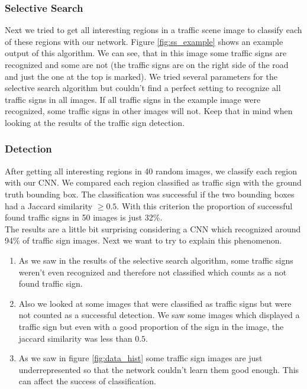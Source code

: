 \documentclass[12pt,a4paper,bibliography=totocnumbered,listof=totocnumbered]{scrartcl}
\begin{document}
\subsubsection{Selective Search}

Next we tried to get all interesting regions in a traffic scene image to classify each of these regions with our network. Figure \ref{fig:ss_example} shows an example output of this algorithm. We can see, that in this image some traffic signs are recognized and some are not (the traffic signs are on the right side of the road and just the one at the top is marked). We tried several parameters for the selective search algorithm but couldn't find a perfect setting to recognize all traffic signs in all images. If all traffic signs in the example image were recognized, some traffic signs in other images will not. Keep that in mind when looking at the results of the traffic sign detection.

\subsubsection{Detection}
After getting all interesting regions in 40 random images, we classify each region with our CNN. We compared each region classified as traffic sign with the ground truth bounding box. The classification was successful if the two bounding boxes had a Jaccard similarity $\geq 0.5$. With this criterion the proportion of successful found traffic signs in 50 images is just 32\%.\\

The results are a little bit surprising considering a CNN which recognized around 94\% of traffic sign images. Next we want to try to explain this phenomenon. 

\begin{enumerate}
\item As we saw in the results of the selective search algorithm, some traffic signs weren't even recognized and therefore not classified which counts as a not found traffic sign. 
\item Also we looked at some images that were classified as traffic signs but were not counted as a successful detection. We saw some images which displayed a traffic sign but even with a good proportion of the sign in the image, the jaccard similarity was less than $0.5$.
\item As we saw in figure \ref{fig:data_hist} some traffic sign images are just underrepresented so that the network couldn't learn them good enough. This can affect the success of classification.
\end{enumerate}
\end{document}
